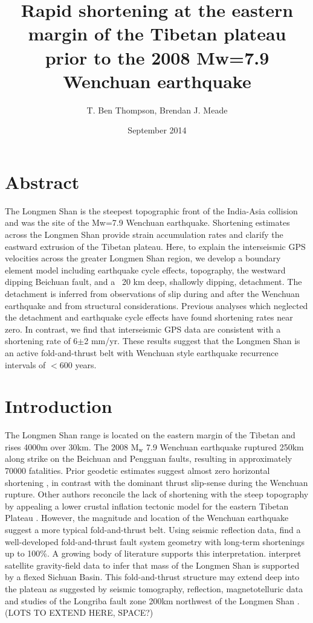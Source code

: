 \documentclass[12pt]{article}
\title{Rapid shortening at the eastern margin of the Tibetan plateau prior to the 2008 Mw=7.9 Wenchuan earthquake}
\author{T. Ben Thompson, Brendan J. Meade}
\date{September 2014}
\begin{document}
\maketitle

\section{Abstract}
The Longmen Shan is the steepest topographic front of the India-Asia collision and was the site of the Mw=7.9 Wenchuan earthquake. Shortening estimates across the Longmen Shan provide strain accumulation rates and clarify the eastward extrusion of the Tibetan plateau. Here, to explain the interseismic GPS velocities across the greater Longmen Shan region, we develop a boundary element model including earthquake cycle effects, topography, the westward dipping Beichuan fault, and a ~20 km deep, shallowly dipping, detachment. The detachment is inferred from observations of slip during and after the Wenchuan earthquake and from structural considerations. Previous analyses which neglected the detachment and earthquake cycle effects have found shortening rates near zero. In contrast, we find that interseismic GPS data are consistent with a shortening rate of 6$\pm$2 mm/yr. These results suggest that the Longmen Shan is an active fold-and-thrust belt with Wenchuan style earthquake recurrence intervals of $<$600 years.

\section{Introduction}
The Longmen Shan range is located on the eastern margin of the Tibetan and rises 4000m over 30km.  The 2008 $\mathrm{M_w}$ 7.9 Wenchuan earthquake ruptured 250km along strike on the Beichuan and Pengguan faults, resulting in approximately 70000 fatalities. Prior geodetic estimates suggest almost zero horizontal shortening \citep{king97, chen00, shen05, Meade07c, Loveless2011}, in contrast with the dominant thrust slip-sense during the Wenchuan rupture.  Other authors reconcile the lack of shortening with the steep topography by appealing a lower crustal inflation tectonic model for the eastern Tibetan Plateau \citep{royden97, bird91, Burchfiel2008a}.  However, the magnitude and location of the Wenchuan earthquake suggest a more typical fold-and-thrust belt.  Using seismic reflection data, \citet{hubbard09} find a well-developed fold-and-thrust fault system geometry with long-term shortenings up to 100\%.  A growing body of literature supports this interpretation. \citet{Fielding2012a} interpret satellite gravity-field data to infer that mass of the Longmen Shan is supported by a flexed Sichuan Basin.  This fold-and-thrust structure may extend deep into the plateau as suggested by seismic tomography, reflection, magnetotelluric data and studies of the Longriba fault zone 200km northwest of the Longmen Shan \citep{Xu2008, Zhang2009, Zhao2012, Ren2013, Guo2013}. (LOTS TO EXTEND HERE, SPACE?)
\end{document}
